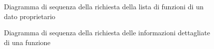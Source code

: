 \begin{figure}[H]
	\noindent
	\caption{Diagramma di sequenza della richiesta della lista di funzioni di un dato proprietario}
\end{figure}

\begin{figure}[H]
	\noindent
	\caption{Diagramma di sequenza della richiesta delle informazioni dettagliate di una funzione}
\end{figure}

